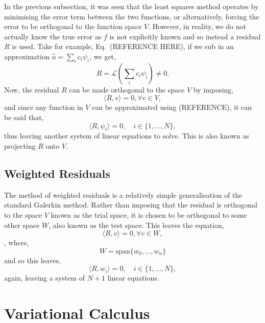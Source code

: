 	In the previous subsection, it was seen that the least squares method operates by minimising the error term between the two functions, or alternatively, forcing the error to be orthogonal to the function space $V$. However, in reality, we do not actually know the true error as $f$ is not explicitly known and so instead a residual $R$ is used. Take for example, Eq.~(REFERENCE HERE), if we sub in an approximation $\hat{u} = \sum_i c_i \psi_i$, we get,
\begin{equation}
	R = \mathcal{L}\left(\sum_i c_i \psi_i\right) \neq 0.
\end{equation}
Now, the residual $R$ can be made orthogonal to the space $V$ by imposing,
\begin{equation}
	\langle R, v \rangle=0, \forall v \in V,
\end{equation}
and since any function in $V$ can be approximated using (REFERENCE), it can be said that,
\begin{equation}
	\langle R, \psi_i \rangle=0,\quad i\in\{1,\dots,N\},
\end{equation}
thus leaving another system of linear equations to solve. This is also known as projecting $R$ onto $V$.

\subsection{Weighted Residuals}

The method of weighted residuals is a relatively simple generalisation of the standard Galerkin method. Rather than imposing that the residual is orthogonal to the space $V$ known as the trial space, it is chosen to be orthogonal to some other space $W$, also known as the test space. This leaves the equation,
\begin{equation}
	\langle R, v \rangle=0, \forall v \in W,
\end{equation},
where,
\begin{equation}
	W = \text{span}\{w_0,\dots,w_n\}
\end{equation}
and so this leaves,
\begin{equation}
	\langle R, w_i \rangle=0,\quad i\in\{1,\dots,N\},
\end{equation}
again, leaving a system of $N+1$ linear equations.

\section{Variational Calculus}

